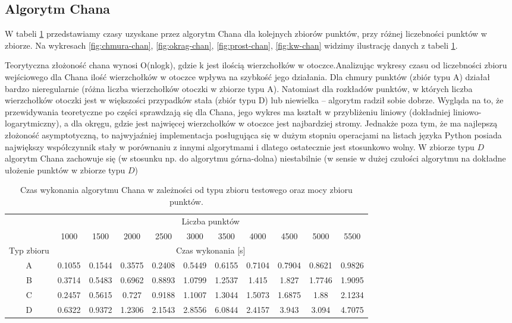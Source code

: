 \documentclass[11pt]{article}
\theoremstyle{remark} \newtheorem{definition}{def.}
\theoremstyle{definition} \newtheorem{twierdzenie}{tw.}
\begin{document}
\subsection{Algorytm Chana}

W tabeli \ref{tab:chan} przedstawiamy czasy uzyskane przez algorytm Chana dla kolejnych zbiorów punktów, przy różnej liczebności punktów w zbiorze. Na wykresach \ref{fig:chmura-chan}, 
\ref{fig:okrag-chan}, \ref{fig:prost-chan}, \ref{fig:kw-chan} widzimy ilustrację danych z tabeli \ref{tab:chan}.


Teorytyczna złożoność chana wynosi O(nlogk), gdzie k jest ilością wierzchołków w otoczce.Analizując wykresy czasu od liczebności zbioru wejściowego dla Chana
ilość wierzchołków w otoczce wpływa na szybkość jego działania. Dla chmury punktów (zbiór typu A) działał bardzo nieregularnie (różna liczba wierzchołków otoczki w zbiorze typu A). Natomiast
dla rozkładów punktów, w których liczba wierzchołków otoczki jest w większości przypadków stała (zbiór typu D) lub niewielka -- algorytm radził sobie dobrze.
Wygląda na to, że przewidywania teoretyczne po części sprawdzają się dla Chana, jego wykres ma kształt w przybliżeniu liniowy (dokładniej liniowo-logarytmiczny), a dla okręgu, gdzie jest najwięcej
wierzchołków w otoczce jest najbardziej stromy. Jednakże poza tym, że ma najlepszą złożoność asymptotyczną, to najwyjaźniej implementacja posługująca się w dużym stopniu operacjami na listach języka Python
posiada największy współczynnik stały w porównaniu z innymi algorytmami i dlatego ostatecznie jest stosunkowo wolny. W zbiorze typu $D$ algorytm Chana zachowuje się (w stosunku np. do algorytmu górna-dolna) niestabilnie
(w sensie w dużej czułości algorytmu na dokładne ułożenie punktów w zbiorze typu $D$)

\begin{table}[]
\centering
\caption{Czas wykonania algorytmu Chana w zależności od typu zbioru testowego oraz mocy zbioru punktów.}
\label{tab:chan}
\begin{tabular}{c|c|c|c|c|c|c|c|c|c|c|}
\cline{2-11}
\multicolumn{1}{l|}{} & \multicolumn{10}{c|}{Liczba punktów} \\ \cline{2-11} 
\multicolumn{1}{l|}{} & 1000 & 1500 & 2000 & 2500 & 3000 & 3500 & 4000 & 4500 & 5000 & 5500 \\ \hline
\multicolumn{1}{|c|}{Typ zbioru} & \multicolumn{10}{c|}{Czas wykonania {[}s{]}} \\ \hline
\multicolumn{1}{|c|}{A} & 0.1055 & 0.1544 & 0.3575 & 0.2408 & 0.5449 & 0.6155 & 0.7104 & 0.7904 & 0.8621 & 0.9826 \\ \hline
\multicolumn{1}{|c|}{B} & 0.3714 & 0.5483 & 0.6962 & 0.8893 & 1.0799 & 1.2537 & 1.415 & 1.827 & 1.7746 & 1.9095 \\ \hline
\multicolumn{1}{|c|}{C} & 0.2457 & 0.5615 & 0.727 & 0.9188 & 1.1007 & 1.3044 & 1.5073 & 1.6875 & 1.88 & 2.1234 \\ \hline
\multicolumn{1}{|c|}{D} & 0.6322 & 0.9372 & 1.2306 & 2.1543 & 2.8556 & 6.0844 & 2.4157 & 3.943 & 3.094 & 4.7075 \\ \hline
\end{tabular}
\end{table}
\end{document}
